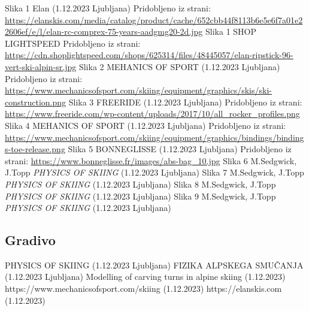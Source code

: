 \documentclass{article}
\begin{document}
\begin{thebibliography}{20}
     Slika 1 Elan (1.12.2023 Ljubljana) Pridobljeno iz strani: \url{https://elanskis.com/media/catalog/product/cache/652cbb44f8113b6e5e6f7a01e22606ef/e/l/elan-rc-comprex-75-years-aadgmg20-2d.jpg}
     Slika 1 SHOP LIGHTSPEED Pridobljeno iz strani: \url{https://cdn.shoplightspeed.com/shops/625314/files/48445057/elan-ripstick-96-vert-ski-alpin-sr.jpg}
     Slika 2 MEHANICS OF SPORT (1.12.2023 Ljubljana) Pridobljeno iz strani: \url{https://www.mechanicsofsport.com/skiing/equipment/graphics/skis/ski-construction.png}
     Slika 3 FREERIDE (1.12.2023 Ljubljana) Pridobljeno iz strani: \url{https://www.freeride.com/wp-content/uploads/2017/10/all_rocker_profiles.png} 
     Slika 4 MEHANICS OF SPORT (1.12.2023 Ljubljana) Pridobljeno iz strani: \url{https://www.mechanicsofsport.com/skiing/equipment/graphics/bindings/bindings-toe-release.png}
     Slika 5 BONNEGLISSE (1.12.2023 Ljubljana) Pridobljeno iz strani: \url{https://www.bonneglisse.fr/images/abs-bag_10.jpg}
     Slika 6 M.Sedgwick, J.Topp \emph{PHYSICS OF SKIING} (1.12.2023 Ljubljana)
     Slika 7 M.Sedgwick, J.Topp \emph{PHYSICS OF SKIING} (1.12.2023 Ljubljana)
     Slika 8 M.Sedgwick, J.Topp \emph{PHYSICS OF SKIING} (1.12.2023 Ljubljana)
     Slika 9 M.Sedgwick, J.Topp \emph{PHYSICS OF SKIING} (1.12.2023 Ljubljana)
\end{thebibliography}


\subsection{Gradivo}

\begin{thebibliography}{widestlabel} 
     PHYSICS OF SKIING (1.12.2023 Ljubljana)
    \bibitem[P.Fakin]{} FIZIKA ALPSKEGA SMUČANJA (1.12.2023 Ljubljana)
     Modelling of carving turns in alpine skiing (1.12.2023)
     https://www.mechanicsofsport.com/skiing (1.12.2023)
    \bibitem[ELAN]{}  https://elanskis.com (1.12.2023)
    
\end{thebibliography}
\end{document}
